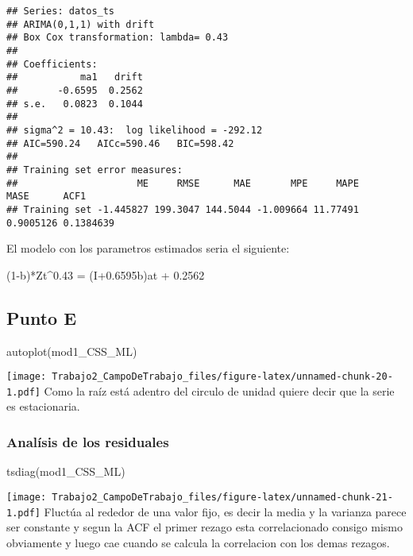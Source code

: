 \documentclass[
]{article}
\newenvironment{Shaded}{\begin{snugshade}}{\end{snugshade}}
\newcommand{\FunctionTok}[1]{\textcolor[rgb]{0.00,0.00,0.00}{#1}}
\newcommand{\NormalTok}[1]{#1}
\begin{document}
\begin{verbatim}
## Series: datos_ts 
## ARIMA(0,1,1) with drift 
## Box Cox transformation: lambda= 0.43 
## 
## Coefficients:
##           ma1   drift
##       -0.6595  0.2562
## s.e.   0.0823  0.1044
## 
## sigma^2 = 10.43:  log likelihood = -292.12
## AIC=590.24   AICc=590.46   BIC=598.42
## 
## Training set error measures:
##                     ME     RMSE      MAE       MPE     MAPE      MASE      ACF1
## Training set -1.445827 199.3047 144.5044 -1.009664 11.77491 0.9005126 0.1384639
\end{verbatim}

El modelo con los parametros estimados seria el siguiente:

(1-b)*Zt\^{}0.43 = (I+0.6595b)at + 0.2562

\hypertarget{punto-e}{%
\subsection{Punto E}\label{punto-e}}

\begin{Shaded}
\begin{Highlighting}[]
\FunctionTok{autoplot}\NormalTok{(mod1\_CSS\_ML)}
\end{Highlighting}
\end{Shaded}

\texttt{[image: Trabajo2\_CampoDeTrabajo\_files/figure-latex/unnamed-chunk-20-1.pdf]}
Como la raíz está adentro del circulo de unidad quiere decir que la
serie es estacionaria.

\hypertarget{analuxedsis-de-los-residuales}{%
\subsubsection{Analísis de los
residuales}\label{analuxedsis-de-los-residuales}}

\begin{Shaded}
\begin{Highlighting}[]
\FunctionTok{tsdiag}\NormalTok{(mod1\_CSS\_ML)}
\end{Highlighting}
\end{Shaded}

\texttt{[image: Trabajo2\_CampoDeTrabajo\_files/figure-latex/unnamed-chunk-21-1.pdf]}
Fluctúa al rededor de una valor fijo, es decir la media y la varianza
parece ser constante y segun la ACF el primer rezago esta correlacionado
consigo mismo obviamente y luego cae cuando se calcula la correlacion
con los demas rezagos.
\end{document}
